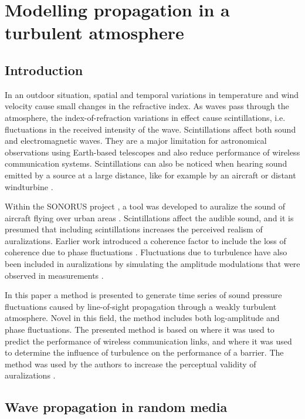 \chapter{Modelling propagation in a turbulent atmosphere}\label{chapter:turbulence}

\section{Introduction}

In an outdoor situation, spatial and temporal variations in temperature and wind
velocity cause small changes in the refractive index. As waves pass through the
atmosphere, the index-of-refraction variations in effect cause scintillations,
i.e. fluctuations in the received intensity of the wave. Scintillations affect
both sound and electromagnetic waves. They are a major limitation for
astronomical observations using Earth-based telescopes and also reduce performance of
wireless communication systems. Scintillations can also be noticed when hearing
sound emitted by a source at a large distance, like for example by an aircraft or distant windturbine \cite{Heutschi2014}.

Within the SONORUS project \cite{Scheuren2014}, a tool was developed to
auralize the sound of aircraft flying over urban areas \cite{Rietdijk2015}.
Scintillations affect the audible sound, and it is presumed that including
scintillations increases the perceived realism of auralizations. Earlier work
introduced a coherence factor to include the loss of coherence due to phase
fluctuations \cite{Shin2006, Arntzen2014b, Arntzen2014a}. Fluctuations due to
turbulence have also been included in auralizations by simulating the amplitude
modulations that were observed in measurements \cite{Heutschi2014, Minard2016}.


In this paper a method is presented to generate time series of sound pressure
fluctuations caused by line-of-sight propagation through a weakly turbulent
atmosphere. Novel in this field, the method includes both log-amplitude and
phase fluctuations. The presented method is based on \cite{Jurado-navas2006}
where it was used to predict the performance of wireless communication links,
and \cite{Forssen2000} where it was used to determine the influence of
turbulence on the performance of a barrier. The method was used by the authors
to increase the perceptual validity of auralizations
\cite{Rietdijk2014,Rietdijk2014a}.

\newpage
\section{Wave propagation in random media}

